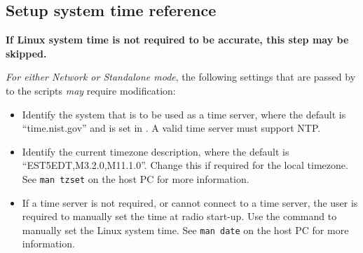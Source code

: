 \iffalse
This file is protected by Copyright. Please refer to the COPYRIGHT file
distributed with this source distribution.

This file is part of OpenCPI <http://www.opencpi.org>

OpenCPI is free software: you can redistribute it and/or modify it under the
terms of the GNU Lesser General Public License as published by the Free Software
Foundation, either version 3 of the License, or (at your option) any later
version.

OpenCPI is distributed in the hope that it will be useful, but WITHOUT ANY
WARRANTY; without even the implied warranty of MERCHANTABILITY or FITNESS FOR A
PARTICULAR PURPOSE. See the GNU Lesser General Public License for more details.

You should have received a copy of the GNU Lesser General Public License along
with this program. If not, see <http://www.gnu.org/licenses/>.
\fi

\newlength{\savedparindentsystime}%
\setlength{\savedparindentsystime}{\parindent}%
\setlength{\parindent}{0pt} %
\providecommand{\forceindent}{\leavevmode{\parindent=1em\indent}}%
\subsection{Setup system time reference}
\label{sec:Setup system time reference}
\textbf{If Linux system time is not required to be accurate, this step may be skipped.} \\ \medskip

\textit{For either Network or Standalone mode}, the following settings that are passed by  to the  scripts \textit{may} require modification:

\begin{itemize}
\item Identify the system that is to be used as a time server, where the default is ``time.nist.gov'' and is set in .
A valid time server must support NTP.
\item Identify the current timezone description, where the default is ``EST5EDT,M3.2.0,M11.1.0''.
Change this if required for the local timezone.
See \texttt{man tzset} on the host PC for more information.
\item If a time server is not required, or cannot connect to a time server, the user is required to manually set the time at radio start-up.
Use the  command to manually set the Linux system time.
See \texttt{man date} on the host PC for more information.
\end{itemize}
\setlength{\parindent}{\savedparindentsystime}%
